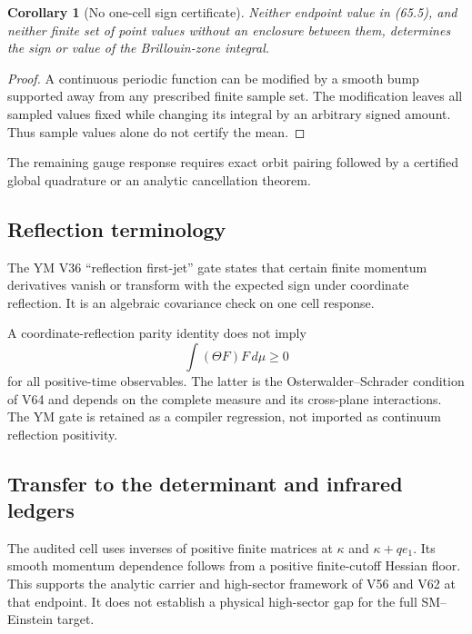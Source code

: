 \documentclass[11pt]{article}
\newtheorem{corollary}[theorem]{Corollary}
\begin{document}
\begin{corollary}[No one-cell sign certificate]
\label{cor:v11v65-no-sign}
Neither endpoint value in (65.5), and neither finite set of point
values without an enclosure between them, determines the sign or value
of the Brillouin-zone integral.
\end{corollary}

\begin{proof}
A continuous periodic function can be modified by a smooth bump
supported away from any prescribed finite sample set.  The
modification leaves all sampled values fixed while changing its
integral by an arbitrary signed amount.  Thus sample values alone do
not certify the mean.
\end{proof}

The remaining gauge response requires exact orbit pairing followed by
a certified global quadrature or an analytic cancellation theorem.

\subsection{Reflection terminology}

The YM V36 “reflection first-jet” gate states that certain finite
momentum derivatives vanish or transform with the expected sign under
coordinate reflection.  It is an algebraic covariance check on one
cell response.

\begin{warning}
\label{warn:v11v65-reflection}
A coordinate-reflection parity identity does not imply
\[
                         \int(\Theta F)F\,d\mu\ge0             \tag{65.6}
\]
for all positive-time observables.  The latter is the
Osterwalder--Schrader condition of V64 and depends on the complete
measure and its cross-plane interactions.  The YM gate is retained as
a compiler regression, not imported as continuum reflection
positivity.
\end{warning}

\subsection{Transfer to the determinant and infrared ledgers}

The audited cell uses inverses of positive finite matrices at
\(\kappa\) and \(\kappa+q e_1\).  Its smooth momentum dependence follows
from a positive finite-cutoff Hessian floor.  This supports the
analytic carrier and high-sector framework of V56 and V62 at that
endpoint.  It does not establish a physical high-sector gap for the
full SM--Einstein target.
\end{document}

